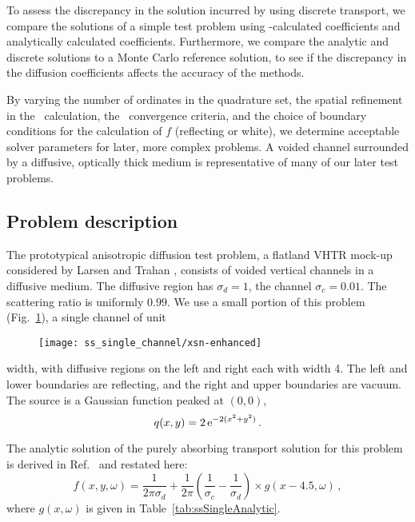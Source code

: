 To assess the discrepancy in the solution incurred by using discrete transport,
we compare the solutions of a simple test problem using \SN-calculated
coefficients and analytically calculated coefficients. Furthermore, we compare
the analytic and discrete solutions to a Monte Carlo reference solution, to see
if the discrepancy in the diffusion coefficients affects the accuracy of
the methods.

By varying the number of ordinates in the quadrature set, the spatial
refinement in the \SN\ calculation, the \SN\ convergence criteria, and the
choice of boundary conditions for the calculation of $f$ (reflecting or white),
we determine acceptable solver parameters for later, more complex
problems.  A
voided channel surrounded by a diffusive, optically thick medium is
representative of many of our later test problems.

\subsection{Problem description}

The prototypical anisotropic diffusion test problem, a flatland VHTR mock-up
considered by Larsen and Trahan \cite{Lar2009c}, consists of voided vertical channels in a
diffusive medium. The diffusive region has $\sigma_d=1$, the channel
$\sigma_c=0.01$. The scattering ratio is uniformly $0.99$.  We use a small
portion of this problem (Fig.~\ref{fig:ssSingleXsn}), a single channel of unit
%
\begin{figure}[tb]
  \centering
  \texttt{[image: ss\_single\_channel/xsn-enhanced]}
  \label{fig:ssSingleXsn}
\end{figure}
%
width, with diffusive regions on the left and right each with width 4. The left
and lower boundaries are reflecting, and the right and upper boundaries are
vacuum. The source is a Gaussian function peaked at $(0,0)$,
\begin{equation*}
  q(x,y) = 2 \mathop{}\!\mathrm{e}^{-2 (x^2 + y^2)}\,.
\end{equation*}

The analytic solution of the purely absorbing transport solution for this
problem is derived in Ref.~\cite{Lar2009c} and restated here:
\begin{equation}\label{eq:ssSingleAnalytic}
  f(x,y,\omega)
  = \frac{1}{2\pi \sigma_d}
  + \frac{1}{2\pi} \left( \frac{1}{\sigma_c} - \frac{1}{\sigma_d} \right)
  \times g(x - 4.5,\omega)\,,
\end{equation}
where $g(x,\omega)$ is given in Table~\ref{tab:ssSingleAnalytic}.

